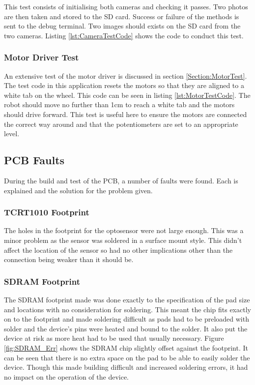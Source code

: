 This test consists of initialising both cameras and checking it passes. Two photos are then taken and stored to the SD card. Success or failure of the methods is sent to the debug terminal. Two images should exists on the SD card from the two cameras. Listing \ref{lst:CameraTestCode} shows the code to conduct this test.


\subsubsection{Motor Driver Test}\label{Motor:Test}
An extensive test of the motor driver is discussed in section \ref{Section:MotorTest}. The test code in this application resets the motors so that they are aligned to a white tab on the wheel. This code can be seen in listing \ref{lst:MotorTestCode}. The robot should move no further than 1cm to reach a white tab and the motors should drive forward. This test is useful here to ensure the motors are connected the correct way around and that the potentiometers are set to an appropriate level.



\subsection{PCB Faults}
During the build and test of the PCB, a number of faults were found. Each is explained and the solution for the problem given. 
\subsubsection{TCRT1010 Footprint}
The holes in the footprint for the optosensor were not large enough. This was a minor problem as the sensor was soldered in a surface mount style. This didn't affect the location of the sensor so had no other implications other than the connection being weaker than it should be. 
\subsubsection{SDRAM Footprint}
The SDRAM footprint made was done exactly to the specification of the pad size and locations with no consideration for soldering. This meant the chip fits exactly on to the footprint and made soldering difficult as pads had to be preloaded with solder and the device's pins were heated and bound to the solder. It also put the device at risk as more heat had to be used that usually necessary. Figure \ref{fig:SDRAM_Err} shows the SDRAM chip slightly offset against the footprint. It can be seen that there is no extra space on the pad to be able to easily solder the device. Though this made building difficult and increased soldering errors, it had no impact on the operation of the device.

